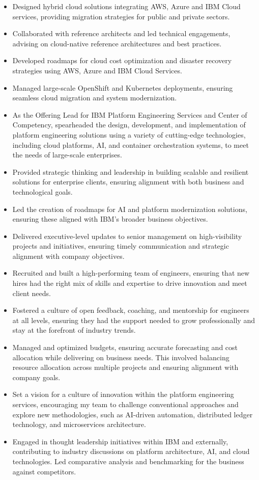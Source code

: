 \documentclass[12pt,parskip=half]{scrartcl}
\begin{document}
\begin{itemize}
    \item Designed hybrid cloud solutions integrating AWS, Azure and IBM Cloud services, providing migration strategies for public and private sectors.
    \item Collaborated with reference architects and led technical engagements, advising on cloud-native reference architectures and best practices.
    \item Developed roadmaps for cloud cost optimization and disaster recovery strategies using AWS, Azure and IBM Cloud Services.
    \item Managed large-scale OpenShift and Kubernetes deployments, ensuring seamless cloud migration and system modernization.
    \item As the Offering Lead for IBM Platform Engineering Services and Center of Competency, spearheaded the design, development, and implementation of platform engineering solutions using a variety of cutting-edge technologies, including cloud platforms, AI, and container orchestration systems, to meet the needs of large-scale enterprises.
    \item Provided strategic thinking and leadership in building scalable and resilient solutions for enterprise clients, ensuring alignment with both business and technological goals.
    \item Led the creation of roadmaps for AI and platform modernization solutions, ensuring these aligned with IBM's broader business objectives.
    \item Delivered executive-level updates to senior management on high-visibility projects and initiatives, ensuring timely communication and strategic alignment with company objectives.
    \item Recruited and built a high-performing team of engineers, ensuring that new hires had the right mix of skills and expertise to drive innovation and meet client needs.
    \item Fostered a culture of open feedback, coaching, and mentorship for engineers at all levels, ensuring they had the support needed to grow professionally and stay at the forefront of industry trends.
    \item Managed and optimized budgets, ensuring accurate forecasting and cost allocation while delivering on business needs. This involved balancing resource allocation across multiple projects and ensuring alignment with company goals.
    \item Set a vision for a culture of innovation within the platform engineering services, encouraging my team to challenge conventional approaches and explore new methodologies, such as AI-driven automation, distributed ledger technology, and microservices architecture.
    \item Engaged in thought leadership initiatives within IBM and externally, contributing to industry discussions on platform architecture, AI, and cloud technologies. Led comparative analysis and benchmarking for the business against competitors.
\end{itemize}
\end{document}
